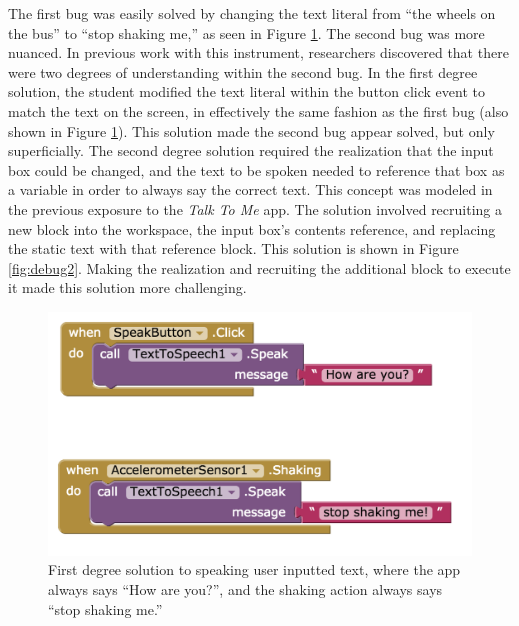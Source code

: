 The first bug was easily solved by changing the text literal from ``the wheels on the bus'' to ``stop shaking me,'' as seen in Figure \ref{fig:debug1}. The second bug was more nuanced. In previous work with this instrument, researchers discovered that there were two degrees of understanding within the second bug. In the first degree solution, the student modified the text literal within the button click event to match the text on the screen, in effectively the same fashion as the first bug (also shown in Figure \ref{fig:debug1}). This solution made the second bug appear solved, but only superficially. The second degree solution required the realization that the input box could be changed, and the text to be spoken needed to reference that box as a variable in order to always say the correct text. This concept was modeled in the previous exposure to the \emph{Talk To Me} app. The solution involved recruiting a new block into the workspace, the input box's contents reference, and replacing the static text with that reference block. This solution is shown in Figure \ref{fig:debug2}. Making the realization and recruiting the additional block to execute it made this solution more challenging.

\begin{figure}
  \centering
      \includegraphics[width=\textwidth]{images/debugActivity/debug1shaking}
  \caption[First degree solutions to the Debugging Activity]{First degree solution to speaking user inputted text, where the app always says ``How are you?'', and the shaking action always says ``stop shaking me.''}
  \label{fig:debug1}
\end{figure}

